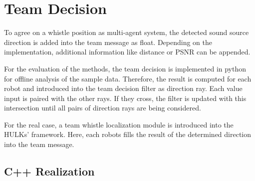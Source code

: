 \section{Team Decision}
\label{sec:03_teamDecision}

To agree on a whistle position as multi-agent system, the detected sound source
direction is added into the team message as float.
Depending on the implementation, additional information like distance or
\ac{PSNR} can be appended.

For the evaluation of the methods, the team decision is implemented in
python for offline analysis of the sample data.
Therefore, the result is computed for each robot and introduced into
the team decision filter as direction ray. %
Each value input is paired with the other rays. If they cross, the
filter is updated with this intersection until all pairs of direction
rays are being considered.

For the real case, a team whistle localization module is
introduced into the HULKs' framework.
Here, each robots fills the result of the determined direction into
the team message.

\subsection{C++ Realization}
\label{subsec:03_cppRealization}

